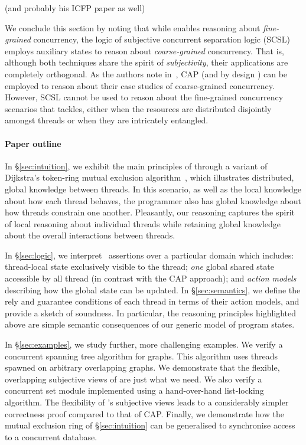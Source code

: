 (and probably his ICFP paper as well)


We conclude this section by noting that while \colosl enables
reasoning about \emph{fine-grained} concurrency, the logic of
subjective concurrent separation logic (SCSL)~\cite{SCSL} employs
auxiliary states to reason about \emph{coarse-grained}
concurrency. That is, although both techniques share the spirit
of \emph{subjectivity}, their applications are completely
orthogonal. As the authors note in~\cite{SCSL}, CAP (and by
design \colosl) can be employed to reason about their case studies of
coarse-grained concurrency. However, SCSL cannot be used to reason
about the fine-grained concurrency scenarios that \colosl tackles,
either when the resources are distributed disjointly amongst threads
or when they are intricately entangled.

\paragraph{Paper outline}
In \S\ref{sec:intuition}, we exhibit the main principles of \colosl
through a variant of Dijkstra's token-ring mutual exclusion
algorithm~\cite{dijkstra74}, which illustrates distributed, global
knowledge between threads. In this scenario, as well as the local
knowledge about how each thread behaves, the programmer also has
global knowledge about how threads constrain one another. Pleasantly,
our reasoning captures the spirit of local reasoning about individual
threads while retaining global knowledge about the overall
interactions between threads.

\todo In \S\ref{sec:logic}, we interpret \colosl\ assertions over a particular domain which includes: thread-local state exclusively visible to the thread; {\em one} global shared state accessible by all thread (in contrast with the CAP approach); and {\em action models} describing how the global state can be updated. In \S\ref{sec:semantics}, we define the rely and guarantee conditions of each thread in terms of their action models, and provide a sketch of soundness. In particular, the reasoning principles highlighted above are simple semantic
consequences of our generic model of program states.  

In \S\ref{sec:examples}, we study further, more challenging examples. We verify a concurrent spanning tree algorithm for graphs. This algorithm uses threads spawned on arbitrary overlapping graphs. We demonstrate that the flexible, overlapping subjective views of \colosl are just what we need.  We also verify a concurrent set module implemented using a hand-over-hand list-locking algorithm.
%
The flexibility of \colosl's subjective views leads to a considerably simpler correctness proof compared to that of CAP. 
%
Finally, we demonstrate how the mutual exclusion ring of \S\ref{sec:intuition} can be generalised to synchronise access to a concurrent database.
